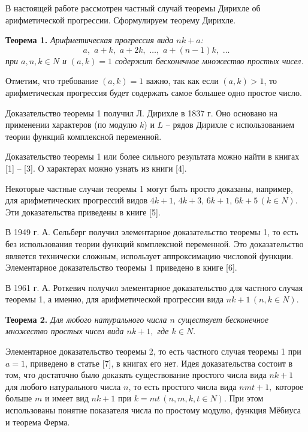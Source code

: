 



\vzmscaption


В настоящей работе рассмотрен частный случай теоремы Дирихле об арифметической прогрессии. Сформулируем теорему Дирихле.

\textbf{Теорема 1.} \emph{Арифметическая прогрессия вида $nk+a$:
$$a,\,\, a+ k,\,\, a+2k,\,\, …,\,\, a+ (n -1)k,\,\, …$$
при $a,n,k \in N$ и $(a,k)= 1$ содержит бесконечное множество простых чисел.}

Отметим, что требование $(a,k)= 1$  важно, так как если $(a,k)> 1$, то арифметическая прогрессия будет содержать самое большее одно простое число.

Доказательство теоремы 1 получил Л. Дирихле в 1837 г. Оно основано на применении характеров (по модулю $k$) и $L$ -- рядов Дирихле с использованием теории функций комплексной переменной.

Доказательство теоремы 1 или более сильного результата можно найти в книгах [1] -- [3]. О характерах можно узнать из книги [4].

Некоторые частные случаи теоремы 1 могут быть просто доказаны, например, для арифметических прогрессий видов $4k +1,\, 4k+ 3,\, 6k+ 1,\, 6k+ 5\, (k \in N).$ Эти доказательства приведены в книге [5].

В 1949 г. А. Сельберг получил элементарное доказательство теоремы 1, то есть без использования теории функций комплексной переменной. Это доказательство является технически сложным, использует аппроксимацию числовой функции. Элементарное доказательство теоремы 1 приведено в книге [6].

В 1961 г. А. Роткевич получил элементарное доказательство для частного случая теоремы 1, а именно, для арифметической прогрессии вида $nk+ 1\, (n,k \in N).$

\textbf{Теорема 2.} \emph{Для любого натурального числа $n$ существует бесконечное множество простых чисел вида $nk+1,$ где $k\in N.$}

Элементарное доказательство теоремы 2, то есть частного случая теоремы 1 при $a= 1$, приведено в статье [7], в книгах его нет. Идея доказательства состоит в том, что достаточно было доказать существование простого числа вида $nk +1$ для любого натурального числа $n$, то есть простого числа вида $n m t+ 1,$ которое больше $m$  и имеет вид $nk +1$ при  $k= m t \,(n,m,k,t \in N).$ При этом использованы понятие показателя числа по простому модулю, функция Мёбиуса и теорема Ферма.



